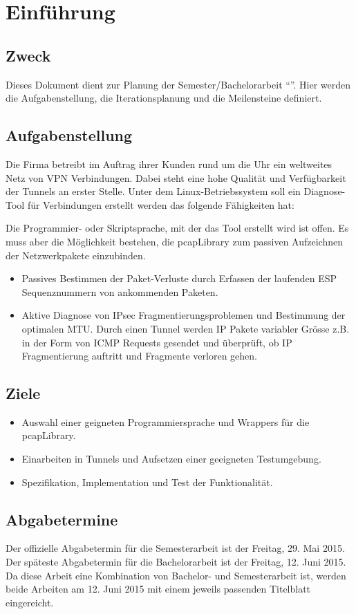 \section{Einführung}
\label{sec:Einführung}

\subsection{Zweck}
Dieses Dokument dient zur Planung der Semester/Bachelorarbeit \enquote{\tool{}}. Hier werden die Aufgabenstellung, die Iterationsplanung und die Meilensteine definiert.

\subsection{Aufgabenstellung}
Die Firma \osag{} betreibt im Auftrag ihrer Kunden rund um die Uhr ein weltweites Netz von VPN Verbindungen. Dabei steht eine hohe Qualität und Verfügbarkeit der \ipsec Tunnels an erster Stelle.
Unter dem Linux-Betriebssystem soll ein Diagnose-Tool für \ipsec Verbindungen erstellt werden das folgende Fähigkeiten hat:

Die Programmier- oder Skriptsprache, mit der das Tool erstellt wird ist offen. Es muss aber die Möglichkeit bestehen, die pcapLibrary zum passiven Aufzeichnen der Netzwerkpakete einzubinden.

\begin{itemize}
	\item Passives Bestimmen der \ipsec{} Paket-Verluste durch Erfassen der laufenden \ac{ESP} Sequenznummern von ankommenden \ipsec{} Paketen.
	\item Aktive Diagnose von IPsec Fragmentierungsproblemen und Bestimmung der optimalen MTU. Durch einen Tunnel werden IP Pakete variabler Grösse z.B. in der Form von \ac{ICMP} Requests gesendet und überprüft, ob \acs{IP} Fragmentierung auftritt und Fragmente verloren gehen.
\end{itemize}

\subsection{Ziele}

\begin{itemize}

  \item Auswahl einer geigneten Programmiersprache und Wrappers für die pcapLibrary.
  \item Einarbeiten in \ipsec{} Tunnels und Aufsetzen einer geeigneten Testumgebung.
  \item Spezifikation, Implementation und Test der \tool{} Funktionalität.

\end{itemize}

\subsection{Abgabetermine}
Der offizielle Abgabetermin für die Semesterarbeit ist der Freitag, 29. Mai 2015.
Der späteste Abgabetermin für die Bachelorarbeit ist der Freitag, 12. Juni 2015.
Da diese Arbeit eine Kombination von Bachelor- und Semesterarbeit ist, werden beide Arbeiten am 12. Juni 2015 mit einem jeweils passenden Titelblatt eingereicht. 